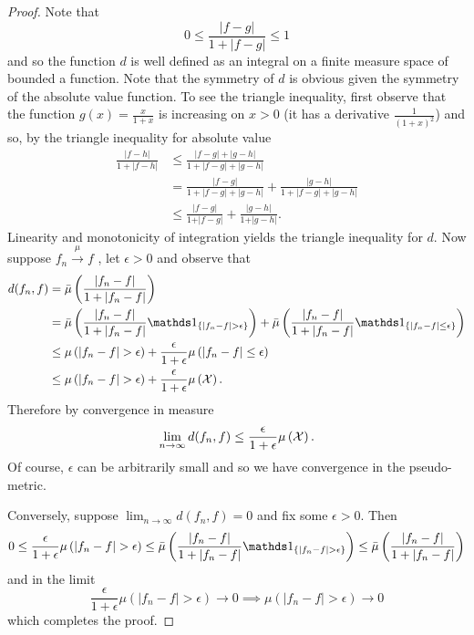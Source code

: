 \begin{proof}
Note that 
\[
0\leq\frac{\lvert f-g\rvert}{1+\lvert f-g\rvert}\leq1
\]
and so the function $d$ is well defined as an integral on a finite
measure space of bounded a function. Note that the symmetry of $d$
is obvious given the symmetry of the absolute value function. To see
the triangle inequality, first observe that the function $g(x)=\frac{x}{1+x}$
is increasing on $x>0$ (it has a derivative $\frac{1}{(1+x)^{2}}$)
and so, by the triangle inequality for absolute value
\begin{align*}
\frac{\lvert f-h\rvert}{1+\lvert f-h\rvert} & \leq\frac{\lvert f-g\rvert+\lvert g-h\rvert}{1+\lvert f-g\rvert+\lvert g-h\rvert}\\
 & =\frac{\lvert f-g\rvert}{1+\lvert f-g\rvert+\lvert g-h\rvert}+\frac{\lvert g-h\rvert}{1+\lvert f-g\rvert+\lvert g-h\rvert}\\
 & \leq\frac{\lvert f-g\rvert}{1+\rvert f-g\rvert}+\frac{\lvert g-h\rvert}{1+\rvert g-h\rvert}.
\end{align*}
Linearity and monotonicity of integration yields the triangle inequality
for $d.$ Now suppose $f_{n}\stackrel{\mu}{\to}f$ , let $\epsilon>0$
and observe that 
\begin{align*}
d(f_{n},f) & =\lebInt{\mu}{\frac{\lvert f_{n}-f\rvert}{1+\lvert f_{n}-f\rvert}}\\
 & =\lebInt{\mu}{\frac{\lvert f_{n}-f\rvert}{1+\lvert f_{n}-f\rvert}\indicate_{\{\lvert f_{n}-f\rvert>\epsilon\}}}+\lebInt{\mu}{\frac{\lvert f_{n}-f\rvert}{1+\lvert f_{n}-f\rvert}\indicate_{\{\lvert f_{n}-f\rvert\leq\epsilon\}}}\\
 & \leq\mu\left(\lvert f_{n}-f\rvert>\epsilon\right)+\frac{\epsilon}{1+\epsilon}\mu\left(\lvert f_{n}-f\rvert\leq\epsilon\right)\\
 & \leq\mu\left(\lvert f_{n}-f\rvert>\epsilon\right)+\frac{\epsilon}{1+\epsilon}\mu\left(\X\right).
\end{align*}
Therefore by convergence in measure 
\[
\lim_{n\to\infty}d(f_{n},f)\leq\frac{\epsilon}{1+\epsilon}\mu\left(\mathcal{X}\right).
\]
Of course, $\epsilon$ can be arbitrarily small and so we have convergence
in the pseudo-metric.

Conversely, suppose $\lim_{n\to\infty}d(f_{n},f)=0$ and fix some
$\epsilon>0$. Then
\[
0\leq\frac{\epsilon}{1+\epsilon}\mu\left(\lvert f_{n}-f\rvert>\epsilon\right)\leq\lebInt{\mu}{\frac{\lvert f_{n}-f\rvert}{1+\lvert f_{n}-f\rvert}\indicate_{\{\lvert f_{n}-f\rvert>\epsilon\}}}\leq\lebInt{\mu}{\frac{\lvert f_{n}-f\rvert}{1+\lvert f_{n}-f\rvert}}
\]
and in the limit 
\[
\frac{\epsilon}{1+\epsilon}\mu\left(\lvert f_{n}-f\rvert>\epsilon\right)\longrightarrow0\implies\mu\left(\lvert f_{n}-f\rvert>\epsilon\right)\longrightarrow0
\]
which completes the proof.
\end{proof}
